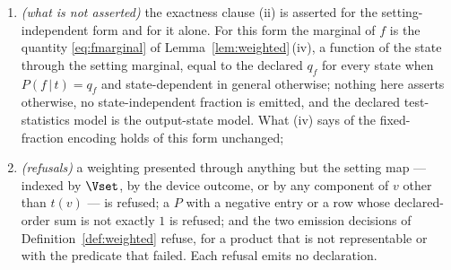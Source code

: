 \begin{theorem}
\begin{enumerate}[label=(\roman*),leftmargin=2.2em,resume]
$\gamma$-coarse-grained physical family of
Definition~\ref{def:chaincond}\,(C4), $G_v=\sum_{w\in\gamma^{-1}(v)}\Fph_w$,
so the emitted family and the physical family weighted by
$P(f\,|\,t(\gamma(w)))$ satisfy the pullback identity \eqref{eq:pullback}
with the outcome correspondence $(w,f)\mapsto(\gamma(w),f)$ restricted to the
support, wherever (C4) is decidable, and are related as (C4)'s families are
wherever it is not. This is \,(i) for the
stochastic matrix from $\Vset$ to $\Vset\times\mathcal{F}$ with entries
$\delta_{vv'}P(f\,|\,t(v'))$;
\item \emph{(what is not asserted)} the exactness clause (ii) is asserted for
the setting-independent form and for it alone. For this form the marginal of
$f$ is the quantity \eqref{eq:fmarginal} of
Lemma~\ref{lem:weighted}\,(iv), a function of the state through the setting
marginal, equal to the declared $q_f$ for every state when $P(f\,|\,t)=q_f$
and state-dependent in general otherwise; nothing here asserts otherwise, no
state-independent fraction is emitted, and the declared test-statistics model
is the output-state model.
What (iv) says of the fixed-fraction encoding holds of this form unchanged;
\item \emph{(refusals)} a weighting presented through anything but the
setting map --- indexed by $\Vset$, by the device outcome, or by any
component of $v$ other than $t(v)$ --- is refused; a $P$ with a negative
entry or a row whose declared-order sum is not exactly $1$ is refused; and
the two emission decisions of Definition~\ref{def:weighted} refuse, for a
product that is not representable or with the predicate that failed. Each
refusal emits no declaration.
\end{enumerate}
\end{theorem}

